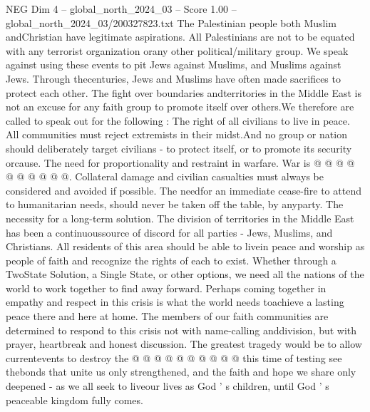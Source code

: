 \begin{textsample}{NEG Dim 4 – global\_north\_2024\_03 – Score 1.00 – global\_north\_2024\_03/200327823.txt}
The Palestinian people both Muslim andChristian have legitimate aspirations.
All Palestinians are not to be equated with any terrorist organization orany other political/military group.
We speak against using these events to pit Jews against Muslims, and Muslims against Jews.
Through thecenturies, Jews and Muslims have often made sacrifices to protect each other.
The fight over boundaries andterritories in the Middle East is not an excuse for any faith group to promote itself over others.We therefore are called to speak out for the following : The right of all civilians to live in peace.
All communities must reject extremists in their midst.And no group or nation should deliberately target civilians - to protect itself, or to promote its security orcause.
The need for proportionality and restraint in warfare.
War is @ @ @ @ @ @ @ @ @ @.
Collateral damage and civilian casualties must always be considered and avoided if possible.
The needfor an immediate cease-fire to attend to humanitarian needs, should never be taken off the table, by anyparty.
The necessity for a long-term solution.
The division of territories in the Middle East has been a continuoussource of discord for all parties - Jews, Muslims, and Christians.
All residents of this area should be able to livein peace and worship as people of faith and recognize the rights of each to exist.
Whether through a TwoState Solution, a Single State, or other options, we need all the nations of the world to work together to find away forward.
Perhaps coming together in empathy and respect in this crisis is what the world needs toachieve a lasting peace there and here at home.
The members of our faith communities are determined to respond to this crisis not with name-calling anddivision, but with prayer, heartbreak and honest discussion.
The greatest tragedy would be to allow currentevents to destroy the @ @ @ @ @ @ @ @ @ @ this time of testing see thebonds that unite us only strengthened, and the faith and hope we share only deepened - as we all seek to liveour lives as God ' s children, until God ' s peaceable kingdom fully comes.

\end{textsample}
